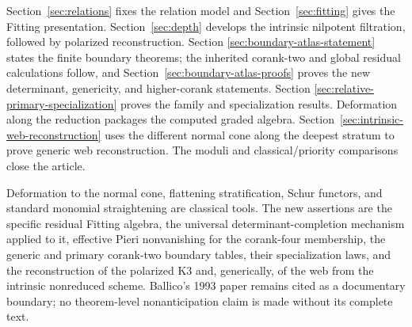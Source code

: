 Section~\ref{sec:relations} fixes the relation model and
Section~\ref{sec:fitting} gives the Fitting presentation.
Section~\ref{sec:depth} develops the intrinsic nilpotent filtration,
followed by polarized reconstruction.  Section
\ref{sec:boundary-atlas-statement} states the finite boundary theorems;
the inherited corank-two and global residual calculations follow, and
Section~\ref{sec:boundary-atlas-proofs} proves the new determinant,
genericity, and higher-corank statements.  Section
\ref{sec:relative-primary-specialization} proves the family and
specialization results.  Deformation along the reduction packages the computed graded algebra.
Section~\ref{sec:intrinsic-web-reconstruction} uses the different
normal cone along the deepest stratum to prove generic web
reconstruction.  The moduli and classical/priority comparisons close
the article.

Deformation to the normal cone, flattening stratification, Schur
functors, and standard monomial straightening are classical tools.
The new assertions are the specific residual Fitting algebra, the
universal determinant-completion mechanism applied to it, effective
Pieri nonvanishing for the corank-four membership, the generic and
primary corank-two boundary tables, their specialization laws, and
the reconstruction of the polarized K3 and, generically, of the web
from the intrinsic nonreduced scheme.  Ballico's 1993 paper remains cited as a documentary boundary;
no theorem-level nonanticipation claim is made without its complete
text.
